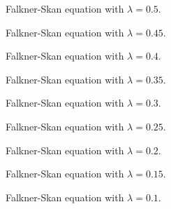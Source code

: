 
\begin{figure}[h]
	\centering
	\def\svgwidth{\textwidth}
	
	\caption{Falkner-Skan equation with $\lambda = 0.5$.}
\end{figure}

\begin{figure}[h]
	\centering
	\def\svgwidth{\textwidth}
	
	\caption{Falkner-Skan equation with $\lambda = 0.45$.}
\end{figure}

\begin{figure}[h]
	\centering
	\def\svgwidth{\textwidth}
	
	\caption{Falkner-Skan equation with $\lambda = 0.4$.}
\end{figure}

\begin{figure}[h]
	\centering
	\def\svgwidth{\textwidth}
	
	\caption{Falkner-Skan equation with $\lambda = 0.35$.}
\end{figure}

\begin{figure}[h]
	\centering
	\def\svgwidth{\textwidth}
	
	\caption{Falkner-Skan equation with $\lambda = 0.3$.}
\end{figure}

\begin{figure}[h]
	\centering
	\def\svgwidth{\textwidth}
	
	\caption{Falkner-Skan equation with $\lambda = 0.25$.}
\end{figure}

\begin{figure}[h]
	\centering
	\def\svgwidth{\textwidth}
	
	\caption{Falkner-Skan equation with $\lambda = 0.2$.}
\end{figure}

\begin{figure}[h]
	\centering
	\def\svgwidth{\textwidth}
	
	\caption{Falkner-Skan equation with $\lambda = 0.15$.}
\end{figure}

\begin{figure}[h]
	\centering
	\def\svgwidth{\textwidth}
	
	\caption{Falkner-Skan equation with $\lambda = 0.1$.}
\end{figure}

